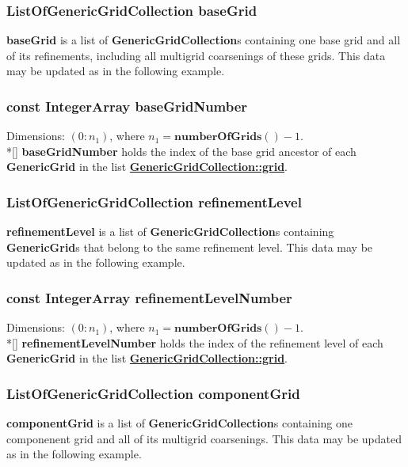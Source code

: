 \documentclass{article}
\begin{document}
  \subsubsection{ListOfGenericGridCollection baseGrid}
  \label{GenericGridCollection::baseGrid}
    \textbf{baseGrid} is
    a list of \textbf{GenericGridCollection}s containing one base grid and all of its refinements, including all multigrid coarsenings of these grids.
    This data may be updated as in the following example.

  \subsubsection{const IntegerArray baseGridNumber}
  \label{GenericGridCollection::baseGridNumber}
    Dimensions: $(0\colon n_1)$, where $n_1 = \textbf{numberOfGrids}() - 1$. \\*[\parskip]
    \textbf{baseGridNumber} holds the index of the base grid ancestor of each \textbf{GenericGrid} in the list
    {\bf{}\hyperref{grid}{grid \rm(\S}{)}{GenericGridCollection::grid}}.

  \subsubsection{ListOfGenericGridCollection refinementLevel}
  \label{GenericGridCollection::refinementLevel}
    \textbf{refinementLevel} is a list of \textbf{GenericGridCollection}s containing \textbf{GenericGrid}s that belong to the same refinement level.
    This data may be updated as in the following example.

  \subsubsection{const IntegerArray refinementLevelNumber}
  \label{GenericGridCollection::refinementLevelNumber}
    Dimensions: $(0\colon n_1)$, where $n_1 = \textbf{numberOfGrids}() - 1$. \\*[\parskip]
    \textbf{refinementLevelNumber} holds the index of the refinement level of each \textbf{GenericGrid} in the list
    {\bf{}\hyperref{grid}{grid \rm(\S}{)}{GenericGridCollection::grid}}.

  \subsubsection{ListOfGenericGridCollection componentGrid}
  \label{GenericGridCollection::componentGrid}
    \textbf{componentGrid} is a list of \textbf{GenericGridCollection}s containing one componenent grid and all of its multigrid coarsenings.
    This data may be updated as in the following example.
\end{document}
